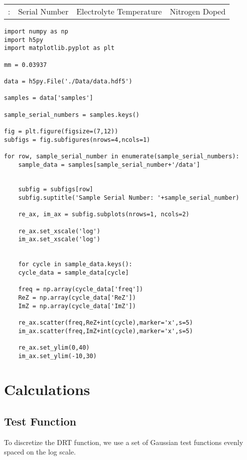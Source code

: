 \documentclass[11pt]{article}
\begin{document}
\begin{center}
\begin{tabular}{llll}
: & Serial Number & Electrolyte Temperature & Nitrogen Doped\\
\end{tabular}
\end{center}


\begin{verbatim}
import numpy as np
import h5py
import matplotlib.pyplot as plt

mm = 0.03937

data = h5py.File('./Data/data.hdf5')

samples = data['samples']

sample_serial_numbers = samples.keys()

fig = plt.figure(figsize=(7,12))
subfigs = fig.subfigures(nrows=4,ncols=1)

for row, sample_serial_number in enumerate(sample_serial_numbers):
    sample_data = samples[sample_serial_number+'/data']


    subfig = subfigs[row]
    subfig.suptitle('Sample Serial Number: '+sample_serial_number)

    re_ax, im_ax = subfig.subplots(nrows=1, ncols=2)    

    re_ax.set_xscale('log')
    im_ax.set_xscale('log')


    for cycle in sample_data.keys():
	cycle_data = sample_data[cycle]

	freq = np.array(cycle_data['freq'])
	ReZ = np.array(cycle_data['ReZ'])
	ImZ = np.array(cycle_data['ImZ'])

	re_ax.scatter(freq,ReZ+int(cycle),marker='x',s=5)
	im_ax.scatter(freq,ImZ+int(cycle),marker='x',s=5)

	re_ax.set_ylim(0,40)
	im_ax.set_ylim(-10,30)

\end{verbatim}



\section{Calculations}
\label{sec:org176ad82}


\subsection{Test Function}
\label{sec:org8198a5a}

To discretize the DRT function, we use a set of Gaussian test functions evenly spaced on the log scale.
\end{document}
